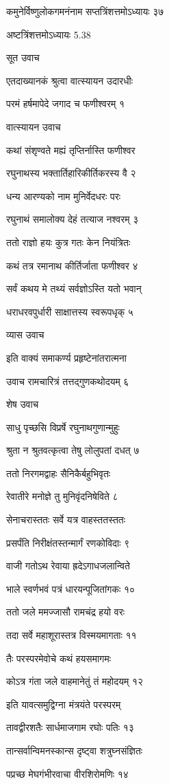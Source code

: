 कमुनेर्विष्णुलोकगमनंनाम सप्तत्रिंशत्तमोऽध्यायः ३७

अष्टत्रिंशत्तमोऽध्यायः 5.38

सूत उवाच

एतदाख्यानकं श्रुत्वा वात्स्यायन उदारधीः

परमं हर्षमापेदे जगाद च फणीश्वरम् १

वात्स्यायन उवाच

कथां संशृण्वते मह्यं तृप्तिर्नास्ति फणीश्वर

रघुनाथस्य भक्तार्तिहारिकीर्तिकरस्य वै २

धन्य आरण्यको नाम मुनिर्वेदधरः परः

रघुनाथं समालोक्य देहं तत्याज नश्वरम् ३

ततो राज्ञो हयः कुत्र गतः केन नियंत्रितः

कथं तत्र रमानाथ कीर्तिर्जाता फणीश्वर ४

सर्वं कथय मे तथ्यं सर्वज्ञोऽस्ति यतो भवान्

धराधरवपुर्धारी साक्षात्तस्य स्वरूपधृक् ५

व्यास उवाच

इति वाक्यं समाकर्ण्य प्रहृष्टेनांतरात्मना

उवाच रामचारित्रं तत्तद्गुणकथोदयम् ६

शेष उवाच

साधु पृच्छसि विप्रर्षे रघुनाथगुणान्मुहुः

श्रुता न श्रुतवत्कृत्वा तेषु लोलुपतां दधत् ७

ततो निरगमद्वाहः सैनिकैर्बहुभिवृतः

रेवातीरे मनोज्ञे तु मुनिवृंदनिषेविते ८

सेनाचरास्ततः सर्वे यत्र वाहस्ततस्ततः

प्रसर्पंति निरीक्षंतस्तन्मार्गं रणकोविदाः ९

वाजी गतोऽथ रेवाया ह्रदेऽगाधजलान्विते

भाले स्वर्णभवं पत्रं धारयन्पूजितांगकः १०

ततो जले ममज्जासौ रामचंद्र हयो वरः

तदा सर्वे महाशूरास्तत्र विस्मयमागताः ११

तैः परस्परमेवोचे कथं हयसमागमः

कोऽत्र गंता जले वाहमानेतुं तं महोदयम् १२

इति यावत्समुद्विग्ना मंत्रयंते परस्परम्

तावद्वीरशतैः सार्धमाजगाम रघोः पतिः १३

तान्सर्वान्विमनस्कान्स दृष्ट्वा शत्रुघ्नसंज्ञितः

पप्रच्छ मेघगंभीरवाचा वीरशिरोमणिः १४

